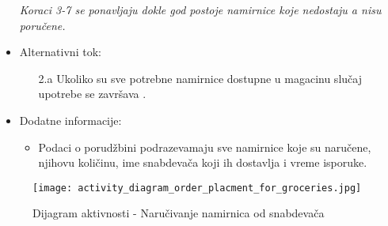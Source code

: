 \begin{itemize}
\begin{enumerate}
		\end{enumerate}
		\textit{Koraci 3-7 se ponavljaju dokle god postoje namirnice koje nedostaju a nisu poručene.}
	\item Alternativni tok:
		\begin{itemize}
		    \item[2.a] Ukoliko su sve potrebne namirnice dostupne u magacinu slučaj upotrebe se završava .
		 
		\end{itemize}
   \item Dodatne informacije:
		\begin{itemize}
		    \item Podaci o porudžbini podrazevamaju sve namirnice koje su naručene, njihovu količinu, ime snabdevača koji ih dostavlja i vreme isporuke.
	
		\end{itemize}
\end{itemize}

\begin{figure}[H]
\begin{center}
\texttt{[image: activity\_diagram\_order\_placment\_for\_groceries.jpg]}
\end{center}
    \caption{Dijagram aktivnosti - Naručivanje namirnica od snabdevača}
\label{fig:Activity_diagram_order_placment_for_groceries}
\end{figure}
